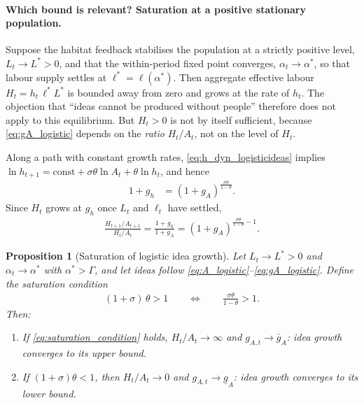 \documentclass[11pt]{article}
\newtheorem{proposition}{Proposition}
\begin{document}
\paragraph{Which bound is relevant? Saturation at a positive stationary population.}
Suppose the habitat feedback stabilises the population at a strictly positive level,
$L_t\to L^\ast>0$, and that the within-period fixed point converges, $\alpha_t\to\alpha^\ast$,
so that labour supply settles at $\ell^\ast=\ell(\alpha^\ast)$. Then aggregate effective labour
$H_t=h_t\,\ell^\ast L^\ast$ is bounded away from zero and grows at the rate of $h_t$.
The objection that ``ideas cannot be produced without people'' therefore does not apply to this
equilibrium. But $H_t>0$ is not by itself sufficient, because \eqref{eq:gA_logistic} depends on the
\emph{ratio} $H_t/A_t$, not on the level of $H_t$.

Along a path with constant growth rates, \eqref{eq:h_dyn_logisticideas} implies
$\ln h_{t+1}=\text{const}+\sigma\theta\ln A_t+\theta\ln h_t$, and hence
\begin{align}
1+g_h &= (1+g_A)^{\frac{\sigma\theta}{1-\theta}}.
\label{eq:gh_gA_link}
\end{align}
Since $H_t$ grows at $g_h$ once $L_t$ and $\ell_t$ have settled,
\begin{align}
\frac{H_{t+1}/A_{t+1}}{H_t/A_t}
=\frac{1+g_h}{1+g_A}
=(1+g_A)^{\frac{\sigma\theta}{1-\theta}-1}.
\label{eq:HA_drift}
\end{align}

\begin{proposition}[Saturation of logistic idea growth]
\label{prop:saturation}
Let $L_t\to L^\ast>0$ and $\alpha_t\to\alpha^\ast$ with $\alpha^\ast>\Gamma$, and let ideas follow
\eqref{eq:A_logistic}--\eqref{eq:gA_logistic}. Define the \emph{saturation condition}
\begin{align}
(1+\sigma)\,\theta>1
\qquad\Longleftrightarrow\qquad
\frac{\sigma\theta}{1-\theta}>1 .
\label{eq:saturation_condition}
\end{align}
Then:
\begin{enumerate}
\item[(i)] If \eqref{eq:saturation_condition} holds, $H_t/A_t\to\infty$ and $g_{A,t}\to\bar g_A$:
idea growth converges to its \emph{upper} bound.
\item[(ii)] If $(1+\sigma)\theta<1$, then $H_t/A_t\to 0$ and $g_{A,t}\to\underline g_A$:
idea growth converges to its \emph{lower} bound.
\end{enumerate}
\end{proposition}
\end{document}
